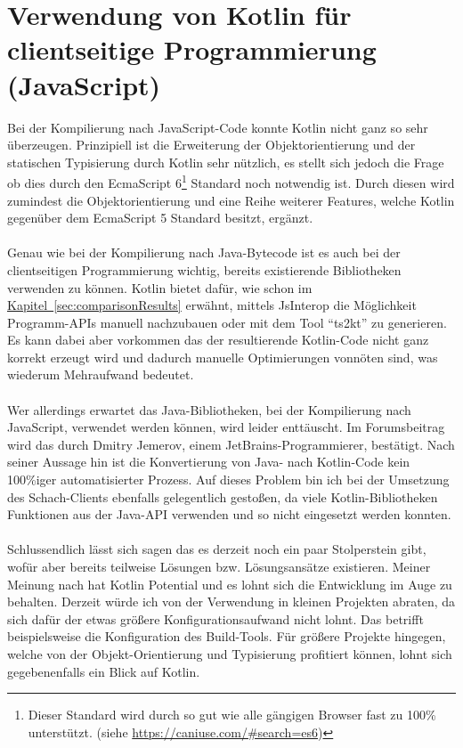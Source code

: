 \section{Verwendung von Kotlin für clientseitige Programmierung (JavaScript)}\label{sec:conclusionKotlinJS}
Bei der Kompilierung nach JavaScript-Code konnte Kotlin nicht ganz so sehr überzeugen. Prinzipiell ist die Erweiterung der Objektorientierung und der statischen Typisierung durch Kotlin sehr nützlich, es stellt sich jedoch die Frage ob dies durch den EcmaScript 6\footnote{Dieser Standard wird durch so gut wie alle gängigen Browser fast zu 100\% unterstützt. (siehe \url{https://caniuse.com/\#search=es6})} Standard noch notwendig ist. Durch diesen wird zumindest die Objektorientierung und eine Reihe weiterer Features, welche Kotlin gegenüber dem EcmaScript 5 Standard besitzt, ergänzt.\\
\\
Genau wie bei der Kompilierung nach Java-Bytecode ist es auch bei der clientseitigen Programmierung wichtig, bereits existierende Bibliotheken verwenden zu können. Kotlin bietet dafür, wie schon im \hyperref[sec:comparisonResults]{Kapitel~\ref{sec:comparisonResults}} erwähnt, mittels \gls{JsInterop} die Möglichkeit Programm-\glspl{API} manuell nachzubauen oder mit dem Tool \enquote{ts2kt} zu generieren. Es kann dabei aber vorkommen das der resultierende Kotlin-Code nicht ganz korrekt erzeugt wird und dadurch manuelle Optimierungen vonnöten sind, was wiederum Mehraufwand bedeutet.\\
\\
Wer allerdings erwartet das Java-Bibliotheken, bei der Kompilierung nach JavaScript, verwendet werden können, wird leider enttäuscht. Im Forumsbeitrag \cite{kotlinJsUseJava} wird das durch Dmitry Jemerov, einem JetBrains-Programmierer, bestätigt. Nach seiner Aussage hin ist die Konvertierung von Java- nach Kotlin-Code kein 100\%iger automatisierter Prozess. Auf dieses Problem bin ich bei der Umsetzung des Schach-Clients ebenfalls gelegentlich gestoßen, da viele Kotlin-Bibliotheken Funktionen aus der Java-\gls{API} verwenden und so nicht eingesetzt werden konnten.\\
\\
Schlussendlich lässt sich sagen das es derzeit noch ein paar Stolperstein gibt, wofür aber bereits teilweise Lösungen bzw. Lösungsansätze existieren. Meiner Meinung nach hat Kotlin Potential und es lohnt sich die Entwicklung im Auge zu behalten. Derzeit würde ich von der Verwendung in kleinen Projekten abraten, da sich dafür der etwas größere Konfigurationsaufwand nicht lohnt. Das betrifft beispielsweise die Konfiguration des Build-Tools. Für größere Projekte hingegen, welche von der Objekt-Orientierung und Typisierung profitiert können, lohnt sich gegebenenfalls ein Blick auf Kotlin.